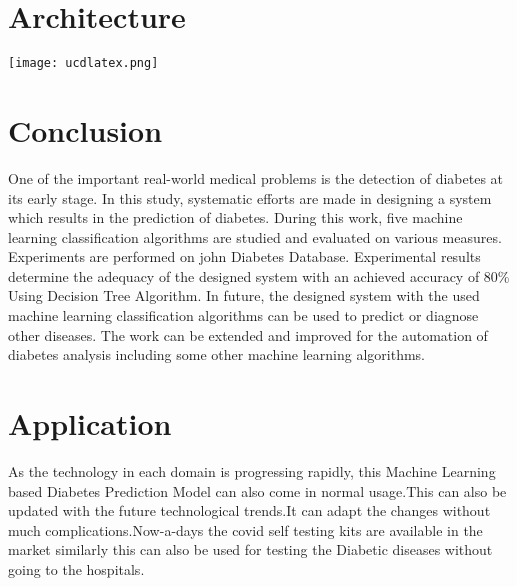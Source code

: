 \documentclass[pdftex,a4paper,11pt,oneside,openright]{report}
\begin{document}
\chapter{Architecture}
\texttt{[image: ucdlatex.png]}


\chapter{Conclusion}
\Large{One of the important real-world medical problems is the detection of diabetes at its early stage. In this study, systematic efforts are made in designing a system which results in the prediction of diabetes. During this work, five machine learning classification algorithms are studied and evaluated on various measures. Experiments are performed on john Diabetes Database. Experimental results determine the adequacy of the designed system with an achieved accuracy of 80\% Using Decision Tree Algorithm.
In future, the designed system with the used machine learning classification algorithms can be used to predict or diagnose other diseases. The work can be extended and improved for the automation of diabetes analysis including some other machine learning algorithms. }

\chapter{Application}
\Large{As the technology in each domain is progressing rapidly, this Machine Learning based Diabetes Prediction Model can also come in normal usage.This can also be updated with the future technological trends.It can adapt the changes without much complications.Now-a-days the covid self testing kits are available in the market similarly this can also be used for testing the Diabetic diseases without going to the hospitals. } 
\end{document}
